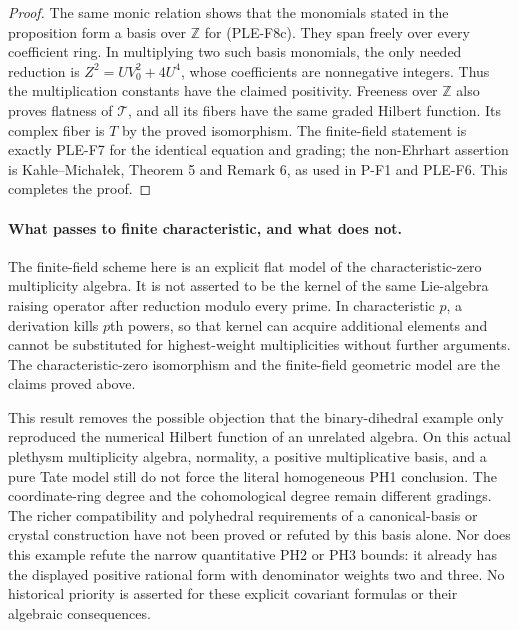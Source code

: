 \begin{proof}
The same monic relation shows that the monomials stated in the
proposition form a basis over $\mathbb Z$ for (PLE-F8c).
They span freely over every coefficient ring. In multiplying two
such basis monomials, the only needed reduction is
$Z^2=UV_0^2+4U^4$, whose coefficients are nonnegative integers.
Thus the multiplication constants have the claimed positivity.
Freeness over $\mathbb Z$ also proves flatness of $\mathcal T$,
and all its fibers have the same graded Hilbert function.
Its complex fiber is $T$ by the proved isomorphism. The finite-field
statement is exactly PLE-F7 for the identical equation and grading;
the non-Ehrhart assertion is Kahle--Micha\l ek, Theorem 5 and
Remark 6, as used in P-F1 and PLE-F6. This completes the proof.
\end{proof}

\paragraph{What passes to finite characteristic, and what does not.}
The finite-field scheme here is an explicit flat model of the
characteristic-zero multiplicity algebra. It is not asserted to be
the kernel of the same Lie-algebra raising operator after reduction
modulo every prime. In characteristic $p$, a derivation kills
$p$th powers, so that kernel can acquire additional elements and
cannot be substituted for highest-weight multiplicities without
further arguments. The characteristic-zero isomorphism and the
finite-field geometric model are the claims proved above.

This result removes the possible objection that the binary-dihedral
example only reproduced the numerical Hilbert function of an
unrelated algebra. On this actual plethysm multiplicity algebra,
normality, a positive multiplicative basis, and a pure Tate model
still do not force the literal homogeneous PH1 conclusion.
The coordinate-ring degree and the cohomological degree remain
different gradings. The richer compatibility and polyhedral
requirements of a canonical-basis or crystal construction have not
been proved or refuted by this basis alone. Nor does this example
refute the narrow quantitative PH2 or PH3 bounds: it already has
the displayed positive rational form with denominator weights two
and three. No historical priority is asserted for these explicit
covariant formulas or their algebraic consequences.
